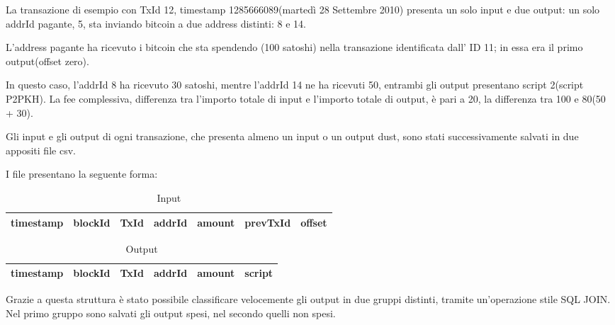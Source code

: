 La transazione di esempio con TxId 12, timestamp 1285666089(martedì 28 Settembre 2010) presenta un solo input e due output: un solo addrId pagante, 5, sta inviando bitcoin a due address distinti: 8 e 14.

L’address pagante
ha ricevuto i bitcoin che sta spendendo (100 satoshi) nella transazione identificata dall' ID 11; in essa era il primo output(offset zero). 

In questo caso, l’addrId 8 ha ricevuto 30 satoshi, mentre l’addrId 14 ne ha ricevuti 50, entrambi gli output presentano script 2(script P2PKH). La fee complessiva, differenza tra l'importo totale di input e l'importo totale di output, è pari a 20, la differenza tra 100 e 80(50 + 30).

Gli input e gli output di ogni transazione, che presenta almeno un input o un output dust, sono stati successivamente salvati in due appositi file csv.

I file presentano la seguente forma:

\begin{table}[h!]
\centering
\begin{tabular}{|r|r|r|r|r|r|r|}
\toprule
 timestamp &  blockId &   TxId &  addrId &     amount &  prevTxId &  offset \\
\bottomrule
\end{tabular}
\caption{Input}
\label{table: input}
\end{table}

\begin{table}[h!]
\centering
\begin{tabular}{|r|r|r|r|r|r|}
\toprule
 timestamp &  blockId &   TxId &  addrId &     amount &  script \\
\bottomrule
\end{tabular}
\caption{Output}
\label{table: output}
\end{table}
Grazie a questa struttura è stato possibile classificare velocemente gli output in due gruppi distinti, tramite un'operazione stile SQL JOIN. Nel primo gruppo sono salvati gli output spesi, nel secondo quelli non spesi. 

